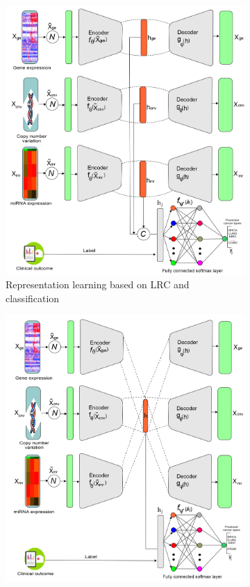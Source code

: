 \begin{figure}
	\centering
	\begin{subfigure}{.48\linewidth}
		\centering
		\includegraphics[scale=0.7]{images/lrc_cls.png}
		\caption{Representation learning based on LRC and classification}
        \label{fig:lrc_11}
	\end{subfigure}
	\begin{subfigure}{0.48\linewidth}
		\centering
		\includegraphics[scale=0.7]{images/joint_rl_cls.png}

\end{subfigure}
\end{figure}
